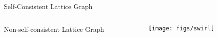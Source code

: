 \begin{frame}{Self-Consistent Lattice Graph}
{\begin{columns}[T]
\begin{column}{.45\textwidth}
\begin{figure}
        \end{figure}
        \small{Non-self-consistent Lattice Graph}
      \end{column}%
      \begin{column}{.45\textwidth}
        \begin{figure}
          \texttt{[image: figs/swirl]}
        \end{figure}
      \end{column}%
    \end{columns}
  }
\end{frame}
